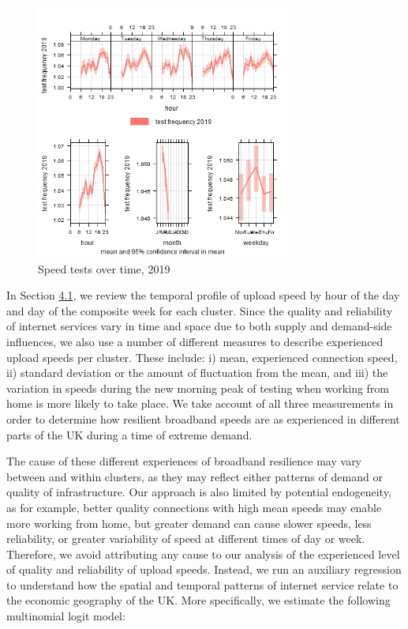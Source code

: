 \documentclass[Royal,times,sageh]{sagej}
\begin{document}
\begin{figure}
\centering
\includegraphics[width=0.75\textwidth,height=0.4\textheight]{figures/time.var.plot2019.png}
\caption{Speed tests over time, 2019 \label{test2019}}
\end{figure}

In Section \protect\hyperlink{sec:4.1}{4.1}, we review the temporal
profile of upload speed by hour of the day and day of the composite week
for each cluster. Since the quality and reliability of internet services
vary in time and space due to both supply and demand-side influences, we
also use a number of different measures to describe experienced upload
speeds per cluster. These include: i) mean, experienced connection
speed, ii) standard deviation or the amount of fluctuation from the
mean, and iii) the variation in speeds during the new morning peak of
testing when working from home is more likely to take place. We take
account of all three measurements in order to determine how resilient
broadband speeds are as experienced in different parts of the UK during
a time of extreme demand.

The cause of these different experiences of broadband resilience may
vary between and within clusters, as they may reflect either patterns of
demand or quality of infrastructure. Our approach is also limited by
potential endogeneity, as for example, better quality connections with
high mean speeds may enable more working from home, but greater demand
can cause slower speeds, less reliability, or greater variability of
speed at different times of day or week. Therefore, we avoid attributing
any cause to our analysis of the experienced level of quality and
reliability of upload speeds. Instead, we run an auxiliary regression to
understand how the spatial and temporal patterns of internet service
relate to the economic geography of the UK. More specifically, we
estimate the following multinomial logit model:
\end{document}

